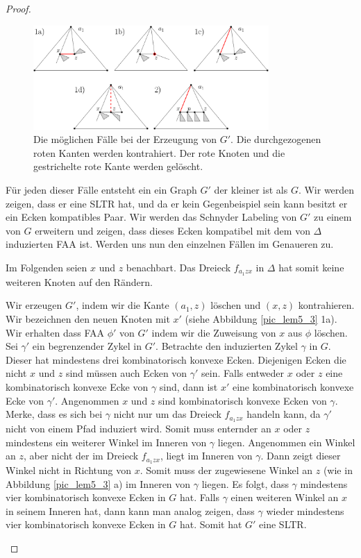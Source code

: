 \begin{proof}
\begin{figure}
	\centering
	  \includegraphics[width=0.8\textwidth]{lem5_2.png}
    	\caption{Die möglichen Fälle bei der Erzeugung von $G'$. Die durchgezogenen roten Kanten werden kontrahiert. Der rote Knoten und die gestrichelte rote Kante werden gelöscht.}
    	\label{pic_lem5_2}
\end{figure}

Für jeden dieser Fälle entsteht ein ein Graph $G'$ der kleiner ist als $G$. Wir werden zeigen, dass er eine SLTR hat, und da er kein Gegenbeispiel sein kann besitzt er ein Ecken kompatibles Paar. Wir werden das Schnyder Labeling von $G'$ zu einem von $G$ erweitern und zeigen, dass dieses Ecken kompatibel mit dem von $\Delta$ induzierten FAA ist. Werden uns nun den einzelnen Fällen im Genaueren zu. 

Im Folgenden seien $x$ und $z$ benachbart. Das Dreieck $f_{a_1zx}$ in $\Delta$ hat somit keine weiteren Knoten auf den Rändern.
\begin{description}[leftmargin =0pt, font = \bfseries]
\item[Fall 1a)] Wir erzeugen $G'$, indem wir die Kante $(a_1,z)$ löschen und $(x,z)$ kontrahieren. Wir bezeichnen den neuen Knoten mit $x'$ (siehe Abbildung \ref{pic_lem5_3} 1a). Wir erhalten dass FAA $\phi'$ von $G'$ indem wir die Zuweisung von $x$ aus $\phi$ löschen. Sei $\gamma'$ ein begrenzender Zykel in $G'$. Betrachte den induzierten Zykel $\gamma$ in $G$. Dieser hat mindestens drei kombinatorisch konvexe Ecken. Diejenigen Ecken die nicht $x$ und $z$ sind müssen auch Ecken von $\gamma'$ sein. Falls entweder $x$ oder $z$ eine kombinatorisch konvexe Ecke von $\gamma$ sind, dann ist $x'$ eine kombinatorisch konvexe Ecke von $\gamma'$. Angenommen $x$ und $z$ sind kombinatorisch konvexe Ecken von $\gamma$. Merke, dass es sich bei $\gamma$ nicht nur um das Dreieck $f_{a_1zx}$ handeln kann, da $\gamma'$ nicht von einem Pfad induziert wird. Somit muss enternder an $x$ oder $z$ mindestens ein weiterer Winkel im Inneren von $\gamma$ liegen. Angenommen ein Winkel an $z$, aber nicht der im Dreieck $f_{a_1zx}$, liegt im Inneren von $\gamma$. Dann zeigt dieser Winkel nicht in Richtung von $x$. Somit muss der zugewiesene Winkel an $z$ (wie in Abbildung \ref{pic_lem5_3} a) im Inneren von $\gamma$ liegen. Es folgt, dass $\gamma$ mindestens vier kombinatorisch konvexe Ecken in $G$ hat. Falls $\gamma$ einen weiteren Winkel an $x$ in seinem Inneren hat, dann kann man analog zeigen, dass $\gamma$ wieder mindestens vier kombinatorisch konvexe Ecken in $G$ hat. Somit hat $G'$ eine SLTR.


\end{description}
\end{proof}
